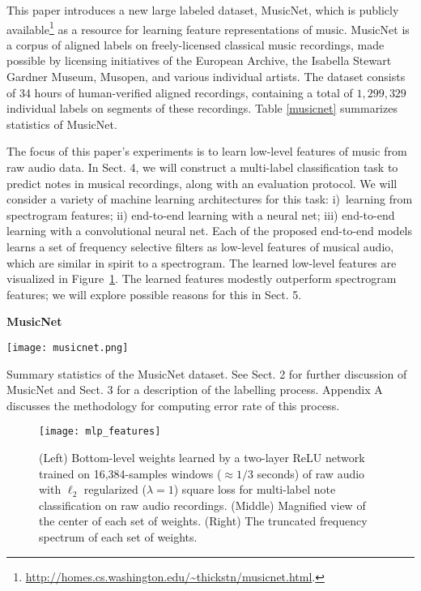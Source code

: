 \documentclass{article} \usepackage{iclr2017_conference,times}
\begin{document}
This paper introduces a new large labeled dataset, MusicNet, which is publicly available\footnote{\url{http://homes.cs.washington.edu/~thickstn/musicnet.html}.} as a resource for learning feature representations of music. MusicNet is a corpus of aligned labels on freely-licensed classical music recordings, made possible by licensing initiatives of the European Archive, the Isabella Stewart Gardner Museum, Musopen, and various individual artists. The dataset consists of 34 hours of human-verified aligned recordings, containing a total of $1,299,329$ individual labels on segments of these recordings. Table \ref{musicnet} summarizes statistics of MusicNet. 

The focus of this paper's experiments is to learn low-level features of music from raw audio data. In Sect. 4, we will construct a multi-label classification task to predict notes in musical recordings, along with an evaluation protocol. We will consider a variety of machine learning architectures for this task: i)~learning from spectrogram features;  ii) end-to-end learning with a neural net;  iii) end-to-end learning with a convolutional neural net. Each of the proposed end-to-end models learns a set of frequency selective filters as low-level features of musical audio, which are similar in spirit to a spectrogram. The learned low-level features are visualized in Figure~\ref{mlp_features}. The learned features modestly outperform spectrogram features; we will explore possible reasons for this in Sect. 5.




\begin{table}[t]
  \centering
  \textbf{\large MusicNet}\par\medskip
  \texttt{[image: musicnet.png]}
  \caption{Summary statistics of the MusicNet dataset. See Sect. 2 for further discussion of MusicNet and Sect. 3 for a description of the labelling process. Appendix A discusses the methodology for computing error rate of this process.}
  \label{musicnet}
\end{table}

\begin{figure}[b]
  \centering
  \texttt{[image: mlp\_features]}
  \caption{(Left) Bottom-level weights learned by a two-layer ReLU network trained on 16,384-samples windows ($\approx 1/3$ seconds) of raw audio with $\ell_2$ regularized ($\lambda=1$) square loss for multi-label note classification on raw audio recordings. (Middle) Magnified view of the center of each set of weights. (Right) The truncated frequency spectrum of each set of weights.}
  \label{mlp_features}
\end{figure}
\end{document}
